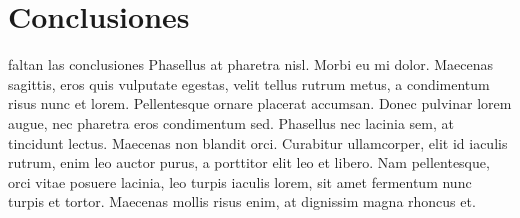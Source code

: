 \chapter{Conclusiones}
faltan las conclusiones Phasellus at pharetra nisl. Morbi eu mi dolor. Maecenas sagittis, eros quis vulputate egestas, velit tellus rutrum metus, a condimentum risus nunc et lorem. Pellentesque ornare placerat accumsan. Donec pulvinar lorem augue, nec pharetra eros condimentum sed. Phasellus nec lacinia sem, at tincidunt lectus. Maecenas non blandit orci. Curabitur ullamcorper, elit id iaculis rutrum, enim leo auctor purus, a porttitor elit leo et libero. Nam pellentesque, orci vitae posuere lacinia, leo turpis iaculis lorem, sit amet fermentum nunc turpis et tortor. Maecenas mollis risus enim, at dignissim magna rhoncus et.

